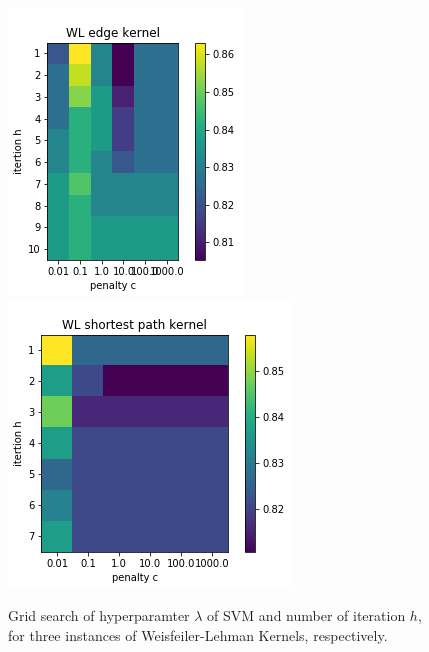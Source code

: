 \documentclass{llncs}
\begin{document}
\begin{figure}[!htb]
  \includegraphics[width=\linewidth]{gk_edge}
  \label{fig:awesome_image2}
\endminipage\hfill
{}%
  \includegraphics[width=\linewidth]{gk_sp}
  \label{fig:awesome_image3}
\endminipage
\caption{Grid search of hyperparamter $\lambda$ of SVM and number of iteration $h$, for three instances of Weisfeiler-Lehman Kernels, respectively. }
\end{figure}
\end{document}
